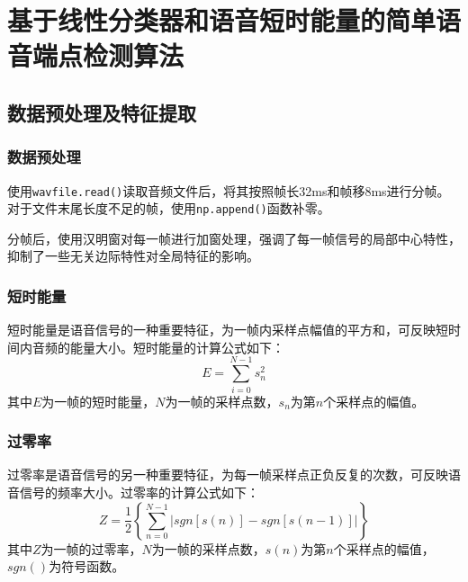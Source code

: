 \documentclass[a4paper]{article}
\begin{document}


\section{基于线性分类器和语音短时能量的简单语音端点检测算法}

\subsection{数据预处理及特征提取}


\subsubsection{数据预处理}

使用\verb|wavfile.read()|读取音频文件后，将其按照帧长32ms和帧移8ms进行分帧。对于文件末尾长度不足的帧，使用\verb|np.append()|函数补零。

分帧后，使用汉明窗对每一帧进行加窗处理，强调了每一帧信号的局部中心特性，抑制了一些无关边际特性对全局特征的影响。

\subsubsection{短时能量}

短时能量是语音信号的一种重要特征，为一帧内采样点幅值的平方和，可反映短时间内音频的能量大小。短时能量的计算公式如下：
\[E=\sum_{i=0}^{N-1}s_n^2\]
其中$E$为一帧的短时能量，$N$为一帧的采样点数，$s_n$为第$n$个采样点的幅值。

\subsubsection{过零率}
过零率是语音信号的另一种重要特征，为每一帧采样点正负反复的次数，可反映语音信号的频率大小。过零率的计算公式如下：
\[Z=\frac{1}{2}\left\{\sum_{n=0}^{N-1}|sgn\left[s\left(n\right)\right]-sgn\left[s\left(n-1\right)\right]|\right\}\]
其中$Z$为一帧的过零率，$N$为一帧的采样点数，$s(n)$为第$n$个采样点的幅值，$sgn()$为符号函数。
\end{document}

